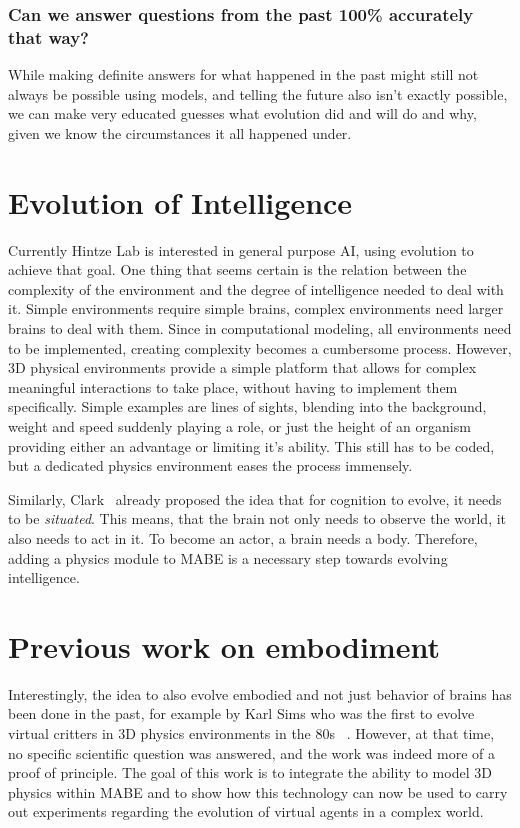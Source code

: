 \documentclass[12pt,oneside,listof=totoc,paper=a4,headings=small]{scrbook}
\begin{document}
\subsubsection{Can we answer questions from the past 100\% accurately that way?}
While making definite answers for what happened in the past might still not always be possible using models, and telling the future also isn't exactly possible, we can make very educated guesses what evolution did and will do and why, given we know the circumstances it all happened under. 

\section{Evolution of Intelligence}

Currently Hintze Lab is interested in general purpose AI, using evolution to achieve that goal. One thing that seems certain is the relation between the complexity of the environment and the degree of intelligence needed to deal with it. Simple environments require simple brains, complex environments need larger brains to deal with them. Since in computational modeling, all environments need to be implemented, creating complexity becomes a cumbersome process. However, 3D physical environments provide a simple platform that allows for complex meaningful interactions to take place, without having to implement them specifically. Simple examples are lines of sights, blending into the background, weight and speed suddenly playing a role, or just the height of an organism providing either an advantage or limiting it's ability. This still has to be coded, but a dedicated physics environment eases the process immensely.

Similarly, Clark~\cite{clark1998being} already proposed the idea that for cognition to evolve, it needs to be \textit{situated}. This means, that the brain not only needs to observe the world, it also needs to act in it. To become an actor, a brain needs a body. Therefore, adding a physics module to MABE is a necessary step towards evolving intelligence.

\newpage

\section{Previous work on embodiment}
Interestingly, the idea to also evolve embodied and not just behavior of brains has been done in the past, for example by Karl Sims who was the first to evolve virtual critters in 3D physics environments in the 80s ~\cite{sims1994evolving}. However, at that time, no specific scientific question was answered, and the work was indeed more of a proof of principle. The goal of this work is to integrate the ability to model 3D physics within MABE and to show how this technology can now be used to carry out experiments regarding the evolution of virtual agents in a complex world. 
\end{document}
